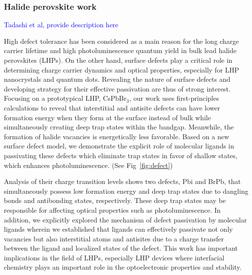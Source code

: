\subsubsection{Halide perovskite work}
\textcolor{blue}{Tadashi et al, provide description here}

High defect tolerance has been considered as a main reason for the long charge carrier lifetime and
high photoluminescence quantum yield in bulk lead halide perovskites (LHPs). On the other hand,
surface defects play a critical role in determining charge carrier dynamics and optical properties,
especially for LHP nanocrystals and quantum dots. Revealing the nature of surface defects and
developing strategy for their effective passivation are thus of strong interest. Focusing on a
prototypical LHP, CsPbBr$_3$, our work uses first-principles calculations to reveal that interstitial and
antisite defects can have lower formation energy when they form at the surface instead of bulk while
simultaneously creating deep trap states within the bandgap. Meanwhile, the formation of halide
vacancies is energetically less favorable. Based on a new surface defect model, we demonstrate the
explicit role of molecular ligands in passivating these defects which eliminate trap states in favor of
shallow states, which enhances photoluminescence. (See Fig~\ref{fig:defect})

Analysis of their charge transition levels shows two
defects, Pbi and BrPb, that simultaneously possess low formation energy and deep trap states due to
dangling bonds and antibonding states, respectively. These deep trap states may be responsible for
affecting optical properties such as photoluminescence. In addition, we explicitly explored the
mechanism of defect passivation by molecular ligands wherein we established that ligands can
effectively passivate not only vacancies but also interstitial atoms and antisites due to a charge transfer
between the ligand and localized states of the defect. This work has important implications in the field
of LHPs, especially LHP devices where interfacial chemistry plays an important role in the
optoelectronic properties and stability.

